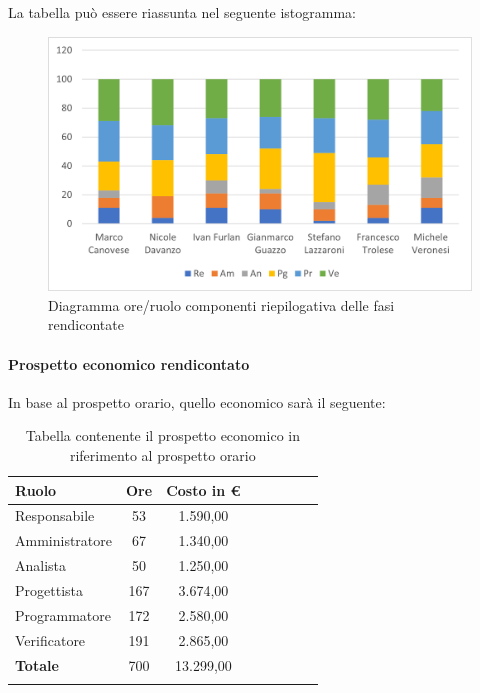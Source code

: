 		
			La tabella può essere riassunta nel seguente istogramma:
		
			\begin{figure}[H]
				\centering
				\includegraphics[width=0.8\linewidth]{res/images/preventivo/totrend1.png}
				\caption{Diagramma ore/ruolo componenti riepilogativa delle fasi rendicontate}
				\label{fig:diagramma suddivisione ruoli riepilogativa delle fasi rendicontate}
			\end{figure}
		
			\paragraph{Prospetto economico rendicontato}
			In base al prospetto orario, quello economico sarà il seguente: 
			
			\begin{longtable}{|l|c|c|c|c|c|c|c|}
				\hline
				\rowcolor{lighter-grayer}
				\textbf{Ruolo} & \textbf{Ore} & \textbf{Costo in €} \\
				\hline
				\endfirsthead
				
				\hline
				Responsabile & 53 & 1.590,00\\
				\hline
				\hline
				Amministratore & 67 & 1.340,00\\
				\hline
				\hline
				Analista & 50 & 1.250,00\\
				\hline
				\hline
				Progettista & 167 & 3.674,00\\
				\hline
				\hline
				Programmatore & 172 & 2.580,00\\
				\hline
				\hline
				Verificatore & 191 & 2.865,00\\
				\hline
				\hline
				\textbf{Totale} & 700 & 13.299,00\\
				\hline
				\rowcolor{white}
				\caption{Tabella contenente il prospetto economico in riferimento al prospetto orario}
			\end{longtable}
			\pagebreak
		
